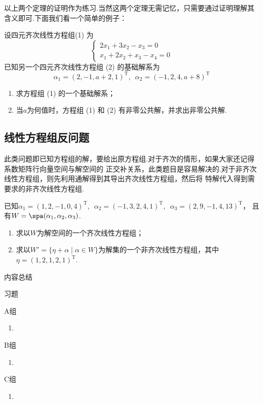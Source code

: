 以上两个定理的证明作为练习.当然这两个定理无需记忆，只需要通过证明理解其含义即可.下面我们看一个简单的例子：
\begin{example}
    设四元齐次线性方程组(1) 为\[\begin{cases}
        2x_1+3x_2-x_3=0 \\ x_1+2x_2+x_3-x_4=0
    \end{cases}\]已知另一个四元齐次线性方程组 (2) 的基础解系为
    \[\alpha_1=(2,-1,a+2,1)^\mathrm{T},\enspace\alpha_2=(-1,2,4,a+8)^\mathrm{T}\]
    \begin{enumerate}
        \item 求方程组 (1) 的一个基础解系；

        \item 当$a$为何值时，方程组 (1) 和 (2) 有非零公共解，并求出非零公共解.
    \end{enumerate}
\end{example}

\subsection{线性方程组反问题}

此类问题即已知方程组的解，要给出原方程组.对于齐次的情形，如果大家还记得系数矩阵行向量空间与解空间的
正交补关系，此类题目是容易解决的.对于非齐次线性方程组，则先利用通解得到其导出齐次线性方程组，然后将
特解代入得到需要求的非齐次线性方程组.
\begin{example}
    已知$\alpha_1=(1,2,-1,0,4)^\mathrm{T},\enspace\alpha_2=(-1,3,2,4,1)^\mathrm{T},\enspace\alpha_3=(2,9,-1,4,13)^\mathrm{T}$，
    且有$W=\spa(\alpha_1,\alpha_2,\alpha_3)$.
    \begin{enumerate}
        \item 求以$W$为解空间的一个齐次线性方程组；

        \item 求以$W'=\{\eta+\alpha \mid \alpha\in W\}$为解集的一个非齐次线性方程组，其中$\eta=(1,2,1,2,1)^\mathrm{T}$.
    \end{enumerate}
\end{example}

\vspace{2ex}
\centerline{\heiti \Large 内容总结}

\vspace{2ex}

\centerline{\heiti \Large 习题}
\vspace{2ex}
{\kaishu }
\begin{flushright}
    \kaishu

\end{flushright}
\centerline{\heiti A组}
\begin{enumerate}
    \item
\end{enumerate}
\centerline{\heiti B组}
\begin{enumerate}
    \item
\end{enumerate}
\centerline{\heiti C组}
\begin{enumerate}
    \item
\end{enumerate}
